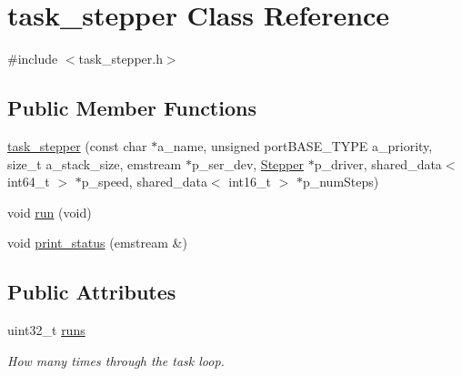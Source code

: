 \hypertarget{classtask__stepper}{\section{task\-\_\-stepper \-Class \-Reference}
\label{classtask__stepper}
}


{\ttfamily \#include $<$task\-\_\-stepper.\-h$>$}

\subsection*{\-Public \-Member \-Functions}
\begin{DoxyCompactItemize}
\item 
\hyperlink{classtask__stepper_ab2e4008527a6fb44a616a69b1d739569}{task\-\_\-stepper} (const char $\ast$a\-\_\-name, unsigned port\-B\-A\-S\-E\-\_\-\-T\-Y\-P\-E a\-\_\-priority, size\-\_\-t a\-\_\-stack\-\_\-size, emstream $\ast$p\-\_\-ser\-\_\-dev, \hyperlink{classStepper}{\-Stepper} $\ast$p\-\_\-driver, shared\-\_\-data$<$ int64\-\_\-t $>$ $\ast$p\-\_\-speed, shared\-\_\-data$<$ int16\-\_\-t $>$ $\ast$p\-\_\-num\-Steps)
\item 
void \hyperlink{classtask__stepper_a7226c812d62d1fb9d67016dea744cfb6}{run} (void)
\item 
void \hyperlink{classtask__stepper_a67f233a746d003c7bdf7e3ca9e629112}{print\-\_\-status} (emstream \&)
\end{DoxyCompactItemize}
\subsection*{\-Public \-Attributes}
\begin{DoxyCompactItemize}
\item 
\hypertarget{classtask__stepper_a366768731c8b95b38d5a53fa7ea16f62}{uint32\-\_\-t \hyperlink{classtask__stepper_a366768731c8b95b38d5a53fa7ea16f62}{runs}}\label{classtask__stepper_a366768731c8b95b38d5a53fa7ea16f62}

\begin{DoxyCompactList}\small\item\em \-How many times through the task loop. \end{DoxyCompactList}\end{DoxyCompactItemize}

